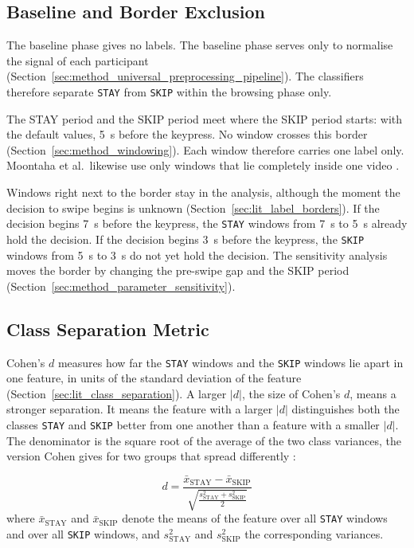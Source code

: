 \documentclass[12pt,a4paper]{report}
\begin{document}
\subsection{Baseline and Border Exclusion}
The baseline phase gives no labels. The baseline phase serves only to normalise the signal of each participant (Section~\ref{sec:method_universal_preprocessing_pipeline}). The classifiers therefore separate \texttt{STAY} from \texttt{SKIP} within the browsing phase only.

The STAY period and the SKIP period meet where the SKIP period starts: with the default values, 5~s before the keypress. No window crosses this border (Section~\ref{sec:method_windowing}). Each window therefore carries one label only. Moontaha et al.\ likewise use only windows that lie completely inside one video \cite{moontaha_online_2023-1}.

Windows right next to the border stay in the analysis, although the moment the decision to swipe begins is unknown (Section~\ref{sec:lit_label_borders}). If the decision begins 7~s before the keypress, the \texttt{STAY} windows from 7~s to 5~s already hold the decision. If the decision begins 3~s before the keypress, the \texttt{SKIP} windows from 5~s to 3~s do not yet hold the decision. The sensitivity analysis moves the border by changing the pre-swipe gap and the SKIP period (Section~\ref{sec:method_parameter_sensitivity}).

\subsection{Class Separation Metric}
\label{sec:method_class_separation_metric}
Cohen's \(d\) measures how far the \texttt{STAY} windows and the \texttt{SKIP} windows lie apart in one feature, in units of the standard deviation of the feature (Section~\ref{sec:lit_class_separation}). A larger \(|d|\), the size of Cohen's \(d\), means a stronger separation. It means the feature with a larger \(|d|\) distinguishes both the classes \texttt{STAY} and \texttt{SKIP} better from one another than a feature with a smaller \(|d|\). The denominator is the square root of the average of the two class variances, the version Cohen gives for two groups that spread differently \cite{cohen_statistical_1988}:

\begin{equation}
    d = \frac{\bar{x}_{\text{STAY}} - \bar{x}_{\text{SKIP}}}{\sqrt{\frac{s_{\text{STAY}}^2 + s_{\text{SKIP}}^2}{2}}}
    \label{eq:cohens_d}
\end{equation}
where \(\bar{x}_{\text{STAY}}\) and \(\bar{x}_{\text{SKIP}}\) denote the means of the feature over all \texttt{STAY} windows and over all \texttt{SKIP} windows, and \(s_{\text{STAY}}^2\) and \(s_{\text{SKIP}}^2\) the corresponding variances.
\end{document}
